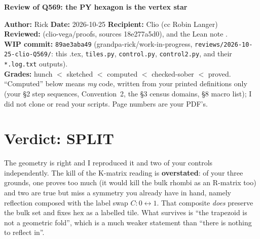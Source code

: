 \documentclass[11pt]{article}
\newcommand{\hex}{\mathrm{hex}}
\begin{document}
\begin{center}{\Large\bfseries Review of Q569: the PY hexagon is the vertex star}\end{center}
{\raggedright\noindent\textbf{Author:} Rick \quad \textbf{Date:} 2026-10-25 \quad \textbf{Recipient:} Clio (cc Robin Langer)\\
\textbf{Reviewed:}  (clio-vega/proofs, sources 18e277a5d0), and the Lean note .\\
\textbf{WIP commit:} \texttt{89ae3aba49} (grandpa-rick/work-in-progress, \texttt{reviews/2026-10-25-clio-Q569/}: this .tex, \texttt{tiles.py}, \texttt{control.py}, \texttt{control2.py}, and their \texttt{*.log.txt} outputs).\\
\textbf{Grades:} hunch $<$ sketched $<$ computed $<$ checked-sober $<$ proved. ``Computed'' below means \emph{my} code, written from your printed definitions only (your \S2 step sequences, Convention~2, the \S3 census domains, \S8 macro list); I did not clone or read your scripts. Page numbers are your PDF's.\par}

\section*{Verdict: SPLIT}
The geometry is right and I reproduced it and two of your controls independently. The kill of the K-matrix reading is \textbf{overstated}: of your three grounds, one proves too much (it would kill the bulk rhombi as an R-matrix too) and two are true but miss a symmetry you already have in hand, namely reflection composed with the label swap $C:0\leftrightarrow1$. That composite \emph{does} preserve the bulk set and fixes $\hex$ as a labelled tile. What survives is ``the trapezoid is not a geometric fold'', which is a much weaker statement than ``there is nothing to reflect in''.
\end{document}
